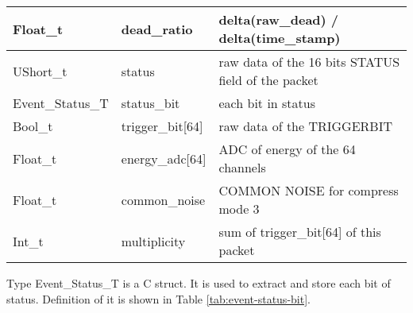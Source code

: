\documentclass[a4paper, 12pt, onecolumn]{article}
\begin{document}
\begin{center}
\begin{supertabular}{| p{28mm} | p{25mm} | p{70mm} |}
    Float\_t           & dead\_ratio         & delta(raw\_dead) / delta(time\_stamp) \\\hline
    UShort\_t          & status              & raw data of the 16 bits STATUS field of the packet \\\hline
    Event\_Status\_T   & status\_bit         & each bit in status \\\hline
    Bool\_t            & trigger\_bit[64]    & raw data of the TRIGGERBIT \\\hline
    Float\_t           & energy\_adc[64]     & ADC of energy of the 64 channels \\\hline
    Float\_t           & common\_noise       & COMMON NOISE for compress mode 3 \\\hline
    Int\_t             & multiplicity        & sum of trigger\_bit[64] of this packet \\
  \end{supertabular}
\end{center}

Type Event\_Status\_T is a C struct. It is used to extract and store each bit of status. Definition of it is shown in Table \ref{tab:event-status-bit}.
\end{document}
